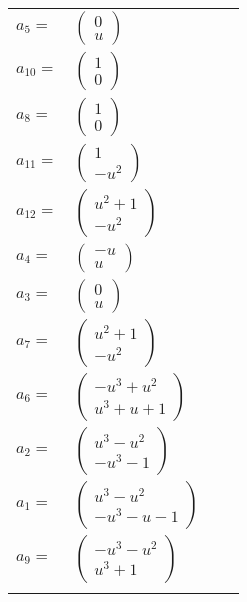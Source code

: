 \documentclass[1p]{elsarticle_modified}
\theoremstyle{definition}
\begin{document}
\begin{tabular}{m{7pt} m{180pt} m{7pt} m{180pt} }
\flushright $a_{5}=$&$\begin{pmatrix}0\\u\end{pmatrix}$ \\
\flushright $a_{10}=$&$\begin{pmatrix}1\\0\end{pmatrix}$ \\
\flushright $a_{8}=$&$\begin{pmatrix}1\\0\end{pmatrix}$ \\
\flushright $a_{11}=$&$\begin{pmatrix}1\\- u^2\end{pmatrix}$ \\
\flushright $a_{12}=$&$\begin{pmatrix}u^2+1\\- u^2\end{pmatrix}$ \\
\flushright $a_{4}=$&$\begin{pmatrix}- u\\u\end{pmatrix}$ \\
\flushright $a_{3}=$&$\begin{pmatrix}0\\u\end{pmatrix}$ \\
\flushright $a_{7}=$&$\begin{pmatrix}u^2+1\\- u^2\end{pmatrix}$ \\
\flushright $a_{6}=$&$\begin{pmatrix}- u^3+u^2\\u^3+u+1\end{pmatrix}$ \\
\flushright $a_{2}=$&$\begin{pmatrix}u^3- u^2\\- u^3-1\end{pmatrix}$ \\
\flushright $a_{1}=$&$\begin{pmatrix}u^3- u^2\\- u^3- u-1\end{pmatrix}$ \\
\flushright $a_{9}=$&$\begin{pmatrix}- u^3- u^2\\u^3+1\end{pmatrix}$\\&\end{tabular}
\end{document}
